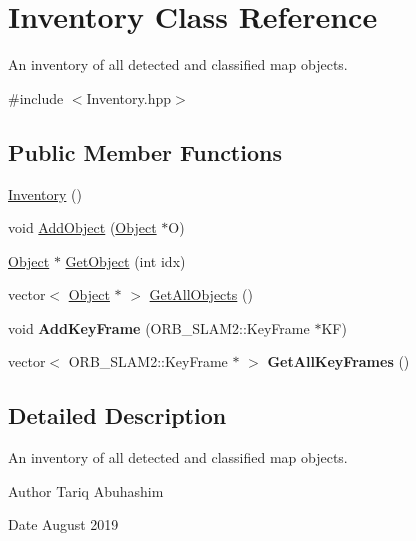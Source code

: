 \hypertarget{classInventory}{}\section{Inventory Class Reference}
\label{classInventory}


An inventory of all detected and classified map objects.  




{\ttfamily \#include $<$Inventory.\+hpp$>$}

\subsection*{Public Member Functions}
\begin{DoxyCompactItemize}
\item 
\hyperlink{classInventory_a10485613fc8bfb32ee564d9b5110f8fb}{Inventory} ()
\item 
void \hyperlink{classInventory_a3622ba6ef9cd884344c055bea63aa02f}{Add\+Object} (\hyperlink{classObject}{Object} $\ast$O)
\item 
\hyperlink{classObject}{Object} $\ast$ \hyperlink{classInventory_ab7bfc70ba945972f1bb1bb440b0e6d5c}{Get\+Object} (int idx)
\item 
vector$<$ \hyperlink{classObject}{Object} $\ast$ $>$ \hyperlink{classInventory_a239cc8d4e9716eed4193c06421e483c2}{Get\+All\+Objects} ()
\item 
\mbox{\label{classInventory_ae1c69f575440659a525115ece8c27fe1}} 
void {\bfseries Add\+Key\+Frame} (O\+R\+B\+\_\+\+S\+L\+A\+M2\+::\+Key\+Frame $\ast$KF)
\item 
\mbox{\label{classInventory_af61cb5f05ee5163f090a6b884cdb7fad}} 
vector$<$ O\+R\+B\+\_\+\+S\+L\+A\+M2\+::\+Key\+Frame $\ast$ $>$ {\bfseries Get\+All\+Key\+Frames} ()
\end{DoxyCompactItemize}


\subsection{Detailed Description}
An inventory of all detected and classified map objects. 

\begin{DoxyAuthor}{Author}
Tariq Abuhashim 
\end{DoxyAuthor}
\begin{DoxyDate}{Date}
August 2019 
\end{DoxyDate}


